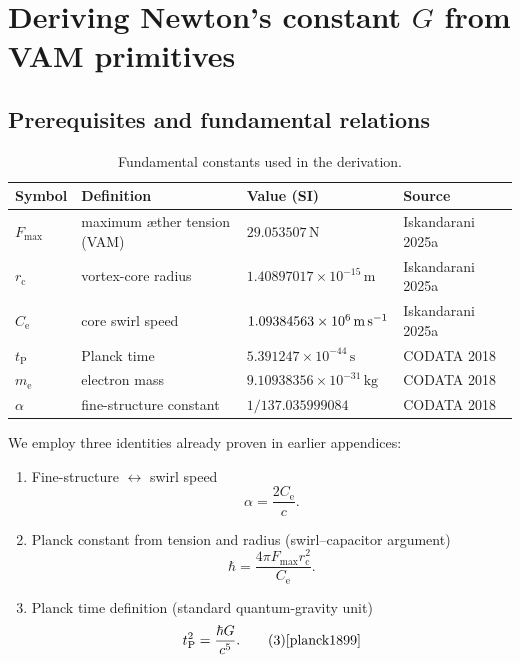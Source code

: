 

\section{Deriving Newton's constant $G$ from VAM primitives}

\subsection{Prerequisites and fundamental relations}

\begin{table}[h]
    \centering
    \begin{tabular}{llll}
        \toprule
        \textbf{Symbol} & \textbf{Definition} & \textbf{Value (SI)} & \textbf{Source} \\
        \midrule
        $F_{\max}$ & maximum æther tension (VAM) & $29.053507\,\text{N}$ & Iskandarani 2025a~\cite{Iskandarani2025a} \\
        $r_{\mathrm{c}}$ & vortex-core radius & $1.40897017\times10^{-15}\,\text{m}$ & Iskandarani 2025a~\cite{Iskandarani2025a} \\
        $C_{\mathrm{e}}$ & core swirl speed & $1.09384563\times10^{6}\,\text{m\,s}^{-1}$ & Iskandarani 2025a~\cite{Iskandarani2025a} \\
        $t_{\mathrm{P}}$ & Planck time & $5.391247\times10^{-44}\,\text{s}$ & CODATA 2018~\cite{CODATA2018} \\
        $m_{\mathrm{e}}$ & electron mass & $9.10938356\times10^{-31}\,\text{kg}$ & CODATA 2018~\cite{CODATA2018} \\
        $\alpha$ & fine-structure constant & $1/137.035999084$ & CODATA 2018~\cite{CODATA2018} \\
        \bottomrule
    \end{tabular}
    \caption{Fundamental constants used in the derivation.}
    \label{tab:constants}
\end{table}

We employ three identities already proven in earlier appendices:

\begin{enumerate}
    \item Fine-structure $\leftrightarrow$ swirl speed
    \begin{equation}
        \alpha = \frac{2C_{\mathrm{e}}}{c}. \tag{1}
    \end{equation}

    \item Planck constant from tension and radius (swirl–capacitor argument)
    \begin{equation}
        \hbar = \frac{4\pi F_{\max} r_{\mathrm{c}}^{2}}{C_{\mathrm{e}}}. \tag{2}
    \end{equation}

    \item Planck time definition (standard quantum-gravity unit)
    \begin{equation}
        t_{\mathrm{P}}^{2}= \frac{\hbar G}{c^{5}}. \tag{3}\hfill\text{\cite{planck1899}}
    \end{equation}
\end{enumerate}

